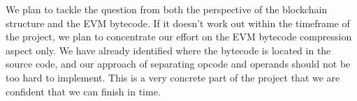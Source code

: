 We plan to tackle the question from both the perspective of the blockchain structure and the EVM bytecode.
If it doesn't work out within the timeframe of the project, we plan to concentrate our effort on the EVM
bytecode compression aspect only.
We have already identified where the bytecode is located in the \eth{} source code, and our approach of
separating opcode and operands should not be too hard to implement.
This is a very concrete part of the project that we are confident that we can finish in time.
